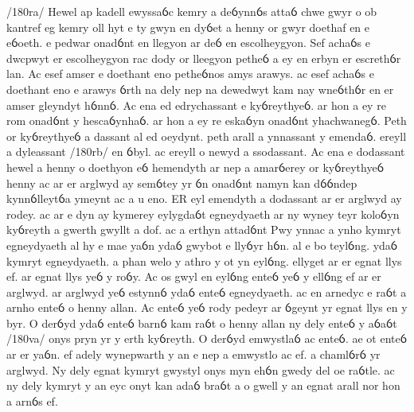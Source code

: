 \begin{spacing}{1}
  \itshape
  \begin{pages}
    \begin{Leftside}
      \beginnumbering
      \textup{/180ra/} Hewel ap kadell ewyssaỽc kemry a deỽynnỽs attaỽ chwe gwyr o ob kantref eg kemry oll hyt e ty gwyn en dyỽet a henny or gwyr doethaf en e eỽoeth. e pedwar onadỽnt en llegyon ar deỽ en escolheygyon. Sef achaỽs e dwcpwyt er escolheygyon rac dody or lleegyon petheỽ a ey en erbyn er escrethỽr lan. Ac esef amser e doethant eno petheỽnos amys arawys. ac esef achaỽs e doethant eno e arawys ỽrth na dely nep na dewedwyt kam nay wneỽthỽr en er amser gleyndyt hỽnnỽ.
      \pend
      \pstart
      Ac ena ed edrychassant e kyỽreythyeỽ. ar hon a ey re rom onadỽnt y hescaỽynhaỽ. ar hon a ey re eskaỽyn onadỽnt yhachwanegỽ. Peth or kyỽreythyeỽ a dassant al ed oeydynt. peth arall a ynnassant y emendaỽ. ereyll a dyleassant \textup{/180rb/} en ỽbyl. ac ereyll o newyd a ssodassant.
      \pend
      \pstart
      Ac ena e dodassant hewel a henny o doethyon eỽ hemendyth ar nep a amarỽerey or kyỽreythyeỽ henny ac ar er arglwyd ay semỽtey yr ỽn onadỽnt namyn kan dỽỽndep kynnỽlleytỽa ymeynt ac a u eno. ER eyl emendyth a dodassant ar er arglwyd ay rodey. ac ar e dyn ay kymerey eylygdaỽt egneydyaeth ar ny wyney teyr koloỽyn kyỽreyth a gwerth gwyllt a dof. ac a erthyn attadỽnt
      \pend
      \pstart
      \pend
      \pstart
      Pwy ynnac a ynho kymryt egneydyaeth al hy e mae yaỽn ydaỽ gwybot e llyỽyr hỽn. al e bo teylỽng. ydaỽ kymryt egneydyaeth. a phan welo y athro y ot yn eylỽng. ellyget ar er egnat llys ef. ar egnat llys yeỽ y roỽy. Ac os gwyl en eylỽng enteỽ yeỽ y ellỽng ef ar er arglwyd. ar arglwyd yeỽ estynnỽ ydaỽ enteỽ egneydyaeth. ac en arnedyc e raỽt a arnho enteỽ o henny allan. Ac enteỽ yeỽ rody pedeyr ar ỽgeynt yr egnat llys en y byr. O derỽyd ydaỽ enteỽ barnỽ kam raỽt o henny allan ny dely enteỽ y aỽaỽt \textup{/180va/} onys pryn yr y erth kyỽreyth. O derỽyd emwystlaỽ ac enteỽ. ae ot enteỽ ar er yaỽn. ef adely wynepwarth y an e nep a emwystlo ac ef. a chamlỽrỽ yr arglwyd. Ny dely egnat kymryt gwystyl onys myn ehỽn gwedy del oe raỽtle. ac ny dely kymryt y an eyc onyt kan adaỽ braỽt a o gwell y an egnat arall nor hon a arnỽs ef.

\end{Leftside}
\end{pages}
\end{spacing}
